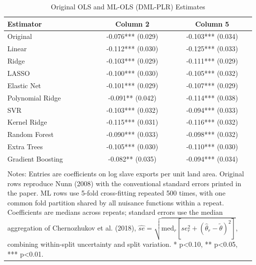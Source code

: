 \begin{table}
\caption{Original OLS and ML-OLS (DML-PLR) Estimates}
\label{tab:ols_vs_mlols_table}
\begin{tabular}{lcc}
\toprule
Estimator & Column 2 & Column 5 \\
\midrule
Original & -0.076*** (0.029) & -0.103*** (0.034) \\
Linear & -0.112*** (0.030) & -0.125*** (0.033) \\
Ridge & -0.103*** (0.029) & -0.111*** (0.029) \\
LASSO & -0.100*** (0.030) & -0.105*** (0.032) \\
Elastic Net & -0.101*** (0.029) & -0.107*** (0.029) \\
Polynomial Ridge & -0.091** (0.042) & -0.114*** (0.038) \\
SVR & -0.103*** (0.032) & -0.094*** (0.033) \\
Kernel Ridge & -0.115*** (0.031) & -0.116*** (0.032) \\
Random Forest & -0.090*** (0.033) & -0.098*** (0.032) \\
Extra Trees & -0.105*** (0.030) & -0.110*** (0.030) \\
Gradient Boosting & -0.082** (0.035) & -0.094*** (0.034) \\
\bottomrule
\\[-0.5em]
\multicolumn{3}{p{0.95\linewidth}}{\footnotesize Notes: Entries are coefficients on log slave exports per unit land area. Original rows reproduce Nunn (2008) with the conventional standard errors printed in the paper. ML rows use 5-fold cross-fitting repeated 500 times, with one common fold partition shared by all nuisance functions within a repeat. Coefficients are medians across repeats; standard errors use the median aggregation of Chernozhukov et al. (2018), $\widehat{se} = \sqrt{\mathrm{med}_r[se_r^2 + (\hat\theta_r - \tilde\theta)^2]}$, combining within-split uncertainty and split variation. * p<0.10, ** p<0.05, *** p<0.01.}\\
\end{tabular}
\end{table}
